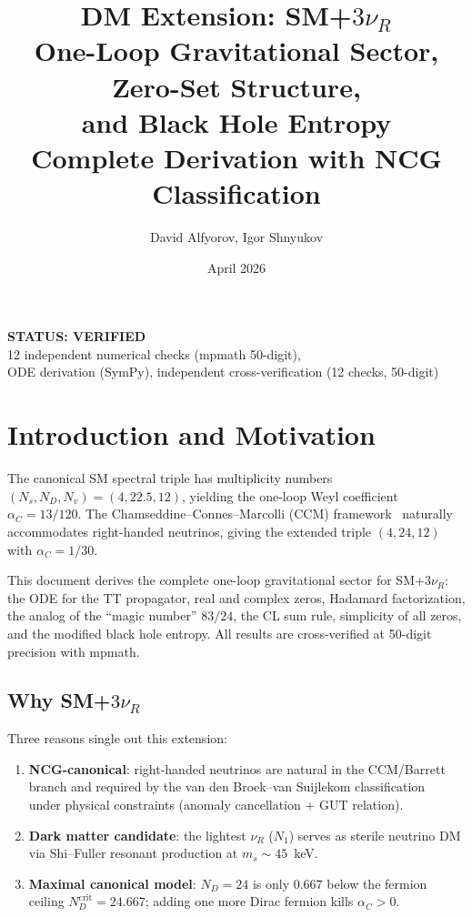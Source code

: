 \documentclass[11pt,a4paper]{article}
\title{%
  \textbf{DM Extension: SM+$3\nu_R$}\\[6pt]
  \Large One-Loop Gravitational Sector, Zero-Set Structure,\\
  and Black Hole Entropy\\[4pt]
  \large Complete Derivation with NCG Classification
}
\author{David Alfyorov, Igor Shnyukov}
\date{April 2026}
\begin{document}
\maketitle

\begin{center}
  \colorbox{verified!15}{\parbox{0.65\textwidth}{\centering
    \textbf{\color{verified} STATUS: VERIFIED}\\[2pt]
    \small 12 independent numerical checks (mpmath 50-digit),\\
    ODE derivation (SymPy), independent cross-verification (12 checks, 50-digit)
  }}
\end{center}

\vspace{1em}
\tableofcontents
\newpage

\section{Introduction and Motivation}

The canonical SM spectral triple has multiplicity numbers $(N_s, N_D, N_v) = (4, 22.5, 12)$,
yielding the one-loop Weyl coefficient $\alpha_C = 13/120$.
The Chamseddine--Connes--Marcolli (CCM) framework~\cite{CCM2007} naturally accommodates
right-handed neutrinos, giving the extended triple $(4, 24, 12)$ with $\alpha_C = 1/30$.

This document derives the complete one-loop gravitational sector for SM+$3\nu_R$:
the ODE for the TT propagator, real and complex zeros, Hadamard factorization,
the analog of the ``magic number'' $83/24$, the CL sum rule, simplicity of all zeros,
and the modified black hole entropy.
All results are cross-verified at 50-digit precision with mpmath.

\subsection*{Why SM+$3\nu_R$}

Three reasons single out this extension:
\begin{enumerate}[label=(\roman*)]
  \item \textbf{NCG-canonical}: right-handed neutrinos are natural in the CCM/Barrett branch
    and required by the van den Broek--van Suijlekom classification~\cite{vdBvS2013}
    under physical constraints (anomaly cancellation + GUT relation).
  \item \textbf{Dark matter candidate}: the lightest $\nu_R$ ($N_1$) serves as sterile neutrino
    DM via Shi--Fuller resonant production at $m_s \sim 45$~keV.
  \item \textbf{Maximal canonical model}: $N_D = 24$ is only $0.667$ below the fermion ceiling
    $N_D^{\mathrm{crit}} = 24.667$; adding one more Dirac fermion kills $\alpha_C > 0$.
\end{enumerate}
\end{document}

